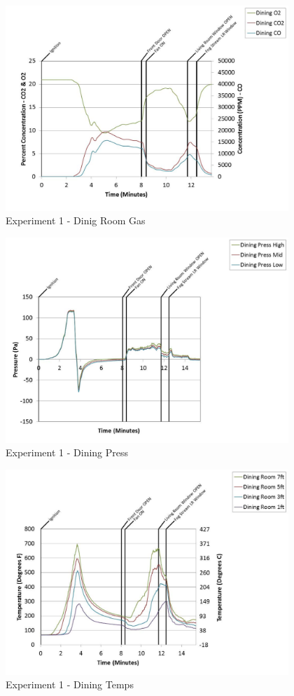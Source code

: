 \documentclass{article}
\begin{document}
\begin{appendices}
	\clearpage

	\begin{figure}[h!]
		\centering
		\includegraphics[height=3.05in]{0_Images/Results_Charts/Exp_1_Charts/DinigRoomGas.pdf}
		\caption{Experiment 1 - Dinig Room Gas}
	\end{figure}
 

	\begin{figure}[h!]
		\centering
		\includegraphics[height=3.05in]{0_Images/Results_Charts/Exp_1_Charts/DiningPress.pdf}
		\caption{Experiment 1 - Dining Press}
	\end{figure}
 
	\clearpage

	\begin{figure}[h!]
		\centering
		\includegraphics[height=3.05in]{0_Images/Results_Charts/Exp_1_Charts/DiningTemps.pdf}
		\caption{Experiment 1 - Dining Temps}
	\end{figure}
 


\end{appendices}
\end{document}
